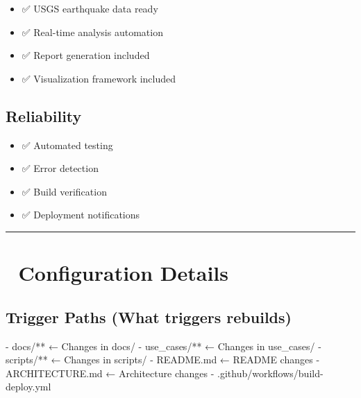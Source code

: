 \documentclass[
  11pt,
  oneside,
  openany]{scrbook}
\newenvironment{Shaded}{\begin{snugshade}}{\end{snugshade}}
\newcommand{\AttributeTok}[1]{\textcolor[rgb]{0.40,0.45,0.13}{#1}}
\newcommand{\KeywordTok}[1]{\textcolor[rgb]{0.00,0.23,0.31}{#1}}
\providecommand{\tightlist}{%
  \setlength{\itemsep}{0pt}\setlength{\parskip}{0pt}}\usepackage{longtable,booktabs,array}
\begin{document}
\begin{itemize}
\tightlist
\item
  ✅ USGS earthquake data ready
\item
  ✅ Real-time analysis automation
\item
  ✅ Report generation included
\item
  ✅ Visualization framework included
\end{itemize}

\section{\texorpdfstring{\textbf{Reliability}}{Reliability}}\label{reliability}

\begin{itemize}
\tightlist
\item
  ✅ Automated testing
\item
  ✅ Error detection
\item
  ✅ Build verification
\item
  ✅ Deployment notifications
\end{itemize}

\begin{center}\rule{0.5\linewidth}{0.5pt}\end{center}

\chapter{🔧 Configuration Details}\label{configuration-details}

\section{\texorpdfstring{\textbf{Trigger Paths} (What triggers
rebuilds)}{Trigger Paths (What triggers rebuilds)}}\label{trigger-paths-what-triggers-rebuilds}

\begin{Shaded}
\begin{Highlighting}[]
\KeywordTok{{-}}\AttributeTok{ docs/**                        ← Changes in docs/}
\KeywordTok{{-}}\AttributeTok{ use\_cases/**                   ← Changes in use\_cases/}
\KeywordTok{{-}}\AttributeTok{ scripts/**                     ← Changes in scripts/}
\KeywordTok{{-}}\AttributeTok{ README.md                      ← README changes}
\KeywordTok{{-}}\AttributeTok{ ARCHITECTURE.md                ← Architecture changes}
\KeywordTok{{-}}\AttributeTok{ .github/workflows/build{-}deploy.yml}
\end{Highlighting}
\end{Shaded}
\end{document}
